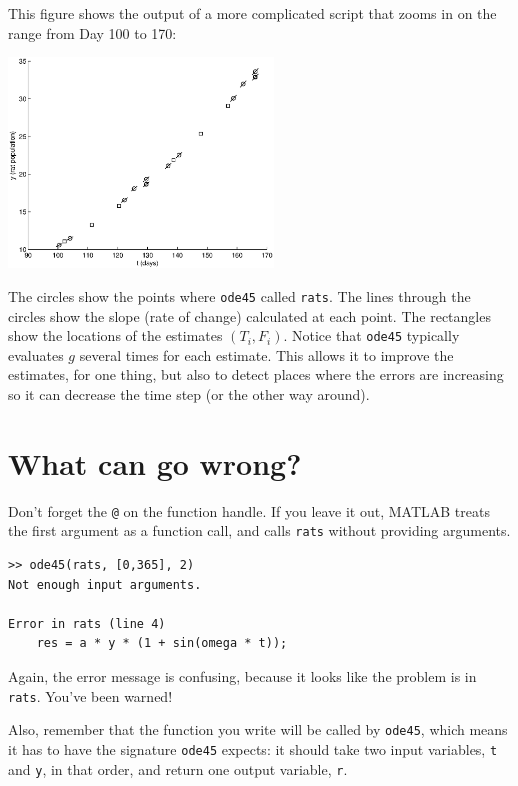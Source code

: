 \documentclass{book}
\begin{document}
This figure shows the output of a more complicated script that zooms 
in on the range from Day 100 to 170:

\beforefig \centerline{\includegraphics[height=2.2in]{figs/ode45.eps}}

The circles show the points where {\tt ode45} called {\tt rats}.
The lines through the circles show the slope (rate of change) calculated
at each point.  The rectangles show the locations of the estimates
$(T_i, F_i)$.  Notice that {\tt ode45} typically evaluates
$g$ several times for each estimate.  This allows it to improve the
estimates, for one thing, but also to detect places where the errors
are increasing so it can decrease the time step (or the other
way around).


\section{What can go wrong?}

Don't forget the {\tt @} on the function handle.
If you leave it out, MATLAB treats the first argument as a function
call, and calls {\tt rats} without providing arguments.

\begin{verbatim}
>> ode45(rats, [0,365], 2)
Not enough input arguments.

Error in rats (line 4)
    res = a * y * (1 + sin(omega * t));
\end{verbatim}

Again, the error message is confusing, because it looks like the problem
is in {\tt rats}.  You've been warned!

Also, remember that the function you write will be called by
{\tt ode45}, which means it has to have the signature {\tt ode45}
expects: it should take two input variables, {\tt t} and {\tt y},
in that order, and return one output variable, {\tt r}.
\end{document}
